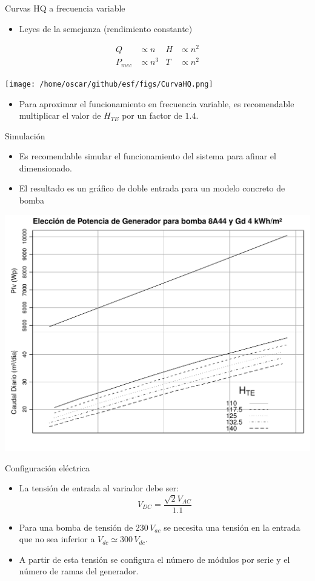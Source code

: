 \documentclass[xcolor={usenames,svgnames,dvipsnames}]{beamer}
\begin{document}
\begin{frame}[label=sec-4-3]{Curvas HQ a frecuencia variable}
\begin{itemize}
\item Leyes de la semejanza (rendimiento constante)
\end{itemize}
\begin{align*}
Q &\propto n &H &\propto n^{2}\\
P_{mec} &\propto n^{3} &T &\propto n^{2}
\end{align*}

\texttt{[image: /home/oscar/github/esf/figs/CurvaHQ.png]}

\begin{itemize}
\item Para aproximar el funcionamiento en frecuencia variable, es recomendable \alert{multiplicar el valor de $H_{TE}$ por un factor de $1.4$}.
\end{itemize}
\end{frame}

\begin{frame}[label=sec-4-4]{Simulación}
\begin{itemize}
\item Es recomendable simular el funcionamiento del sistema para afinar el dimensionado.
\item El resultado es un gráfico de doble entrada para un modelo concreto de bomba
\end{itemize}
\includegraphics[width=.9\linewidth]{../figs/AbacoBomba.pdf}
\end{frame}

\begin{frame}[label=sec-4-5]{Configuración eléctrica}
\begin{itemize}
\item La tensión de entrada al variador debe ser:$$V_{DC}=\frac{\sqrt{2}V_{AC}}{1.1}$$

\item Para una bomba de tensión de $230\, V_{ac}$ se necesita una tensión en la entrada que no sea inferior a $V_{dc}\simeq300\, V_{dc}$.

\item A partir de esta tensión se configura el número de módulos por serie y el número de ramas del generador.
\end{itemize}
\end{frame}
\end{document}
